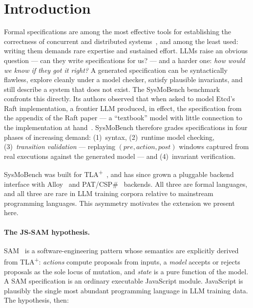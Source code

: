 \documentclass[11pt]{article}
\newcommand{\jssam}{JS-SAM}
\newcommand{\tlaplus}{TLA\texorpdfstring{\textsuperscript{+}}{+}}
\begin{document}
\section{Introduction}
\label{sec:intro}

Formal specifications are among the most effective tools for establishing the
correctness of concurrent and distributed systems~\cite{newcombe2015amazon},
and among the least used: writing them demands rare expertise and sustained
effort. LLMs raise an obvious question --- can they write specifications for
us? --- and a harder one: \emph{how would we know if they got it right?}
A generated specification can be syntactically flawless, explore cleanly under
a model checker, satisfy plausible invariants, and still describe a system
that does not exist. The SysMoBench benchmark~\cite{sysmobench} confronts this
directly. Its authors observed that when asked to model Etcd's Raft
implementation, a frontier LLM produced, in effect, the specification from the
appendix of the Raft paper --- a ``textbook'' model with little connection to
the implementation at hand~\cite{sigops2026}. SysMoBench therefore grades
specifications in four phases of increasing demand: (1)~syntax, (2)~runtime
model checking, (3)~\emph{transition validation} --- replaying
$(\mathit{pre}, \mathit{action}, \mathit{post})$ windows captured from real
executions against the generated model --- and (4)~invariant verification.

SysMoBench was built for \tlaplus{}~\cite{lamport2002specifying}, and has since
grown a pluggable backend interface with Alloy~\cite{jackson2002alloy} and
PAT/CSP\#~\cite{sun2009pat} backends. All three are formal languages, and all
three are rare in LLM training corpora relative to mainstream programming
languages. This asymmetry motivates the extension we present here.

\paragraph{The \jssam{} hypothesis.}
SAM~\cite{sam,dubray2016infoq} is a software-engineering pattern whose
semantics are explicitly derived from \tlaplus{}: \emph{actions} compute
proposals from inputs, a \emph{model} accepts or rejects proposals as the sole
locus of mutation, and \emph{state} is a pure function of the model. A SAM
specification is an ordinary executable JavaScript module. JavaScript is
plausibly the single most abundant programming language in LLM training data.
The hypothesis, then:
\end{document}
